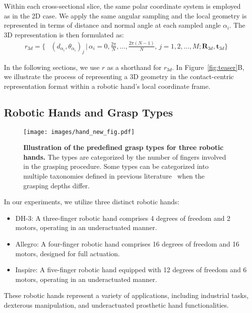 Within each cross-sectional slice, the same polar coordinate system is employed as in the 2D case. We apply the same angular sampling and the local geometry is represented in terms of distance and normal angle at each sampled angle $\alpha_i$. The 3D representation is then formulated as:
\begin{align}
r_{3d} = \bigg\{ & (d_{\alpha_i}, \theta_{\alpha_i})_j \, \bigg| \, \alpha_i = 0, \frac{2\pi}{N}, \ldots, \frac{2\pi (N-1)}{N}, \, j = 1, 2, \ldots, M; \mathbf{R}_{3d},\mathbf{t}_{3d} \bigg\}
\label{eqn_r3d}
\end{align} 

In the following sections, we use $r$ as a shorthand for $r_{3d}$. In Figure~\ref{fig:teaser}B, we illustrate the process of representing a 3D geometry in the contact-centric representation format within a robotic hand's local coordinate frame.

\subsection{Robotic Hands and Grasp Types} 


\begin{figure}[t]
    \centering
    \texttt{[image: images/hand\_new\_fig.pdf]}
    \caption{\textbf{Illustration of the predefined grasp types for three robotic hands.} The types are categorized by the number of fingers involved in the grasping procedure. Some types can be categorized into multiple taxonomies defined in previous literature~\cite{feix2015grasp} when the grasping depths differ.}
    \label{fig:hand_pose}
\end{figure}

In our experiments, we utilize three distinct robotic hands:
\begin{itemize}
    \item DH-3: A three-finger robotic hand comprises 4 degrees of freedom and 2 motors, operating in an underactuated manner.
    \item Allegro: A four-finger robotic hand comprises 16 degrees of freedom and 16 motors, designed for full actuation.
    \item Inspire: A five-finger robotic hand equipped with 12 degrees of freedom and 6 motors, operating in an underactuated manner.
\end{itemize}
These robotic hands represent a variety of applications, including industrial tasks, dexterous manipulation, and underactuated prosthetic hand functionalities.

